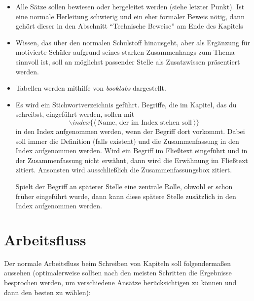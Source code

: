 \documentclass{article}
\begin{document}
\begin{itemize}[leftmargin=.5cm]
	\item Alle Sätze sollen bewiesen oder hergeleitet werden (siehe letzter Punkt). Ist eine normale Herleitung schwierig und ein eher formaler Beweis nötig, dann gehört dieser in den Abschnitt \enquote{Technische Beweise} am Ende des Kapitels
	\item Wissen, das über den normalen Schulstoff hinausgeht, aber als Ergänzung für motivierte Schüler aufgrund seines starken Zusammenhangs zum Thema sinnvoll ist, soll an möglichst passender Stelle als Zusatzwissen präsentiert werden.
	\item Tabellen werden mithilfe von \emph{booktabs} dargestellt.
	\item Es wird ein Stichwortverzeichnis geführt. Begriffe, die im Kapitel, das du schreibst, eingeführt werden, sollen mit 
	\[\backslash index\{\langle\: \text{Name, der im Index stehen soll}\:\rangle\}\] 
	in den Index aufgenommen werden, wenn der Begriff dort vorkommt. Dabei soll immer die Definition (falls existent) und die Zusammenfassung in den Index aufgenommen werden. Wird ein Begriff im Fließtext eingeführt und in der Zusammenfassung nicht erwähnt, dann wird die Erwähnung im Fließtext zitiert. Ansonsten wird ausschließlich die Zusammenfassungsbox zitiert.
	
	Spielt der Begriff an späterer Stelle eine zentrale Rolle, obwohl er schon früher eingeführt wurde, dann kann diese spätere Stelle zusätzlich in den Index aufgenommen werden.
\end{itemize}

\section*{Arbeitsfluss}

Der normale Arbeitsfluss beim Schreiben von Kapiteln soll folgendermaßen aussehen (optimalerweise sollten nach den meisten Schritten die Ergebnisse besprochen werden, um verschiedene Ansätze berücksichtigen zu können und dann den besten zu wählen):
\end{document}
